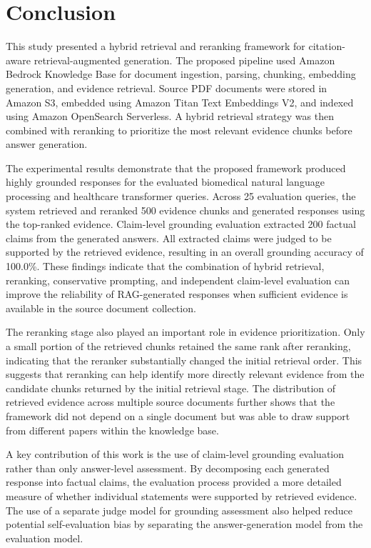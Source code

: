 \section{Conclusion}

This study presented a hybrid retrieval and reranking framework for citation-aware retrieval-augmented generation. The proposed pipeline used Amazon Bedrock Knowledge Base for document ingestion, parsing, chunking, embedding generation, and evidence retrieval. Source PDF documents were stored in Amazon S3, embedded using Amazon Titan Text Embeddings V2, and indexed using Amazon OpenSearch Serverless. A hybrid retrieval strategy was then combined with reranking to prioritize the most relevant evidence chunks before answer generation.

The experimental results demonstrate that the proposed framework produced highly grounded responses for the evaluated biomedical natural language processing and healthcare transformer queries. Across 25 evaluation queries, the system retrieved and reranked 500 evidence chunks and generated responses using the top-ranked evidence. Claim-level grounding evaluation extracted 200 factual claims from the generated answers. All extracted claims were judged to be supported by the retrieved evidence, resulting in an overall grounding accuracy of 100.0\%. These findings indicate that the combination of hybrid retrieval, reranking, conservative prompting, and independent claim-level evaluation can improve the reliability of RAG-generated responses when sufficient evidence is available in the source document collection.

The reranking stage also played an important role in evidence prioritization. Only a small portion of the retrieved chunks retained the same rank after reranking, indicating that the reranker substantially changed the initial retrieval order. This suggests that reranking can help identify more directly relevant evidence from the candidate chunks returned by the initial retrieval stage. The distribution of retrieved evidence across multiple source documents further shows that the framework did not depend on a single document but was able to draw support from different papers within the knowledge base.

A key contribution of this work is the use of claim-level grounding evaluation rather than only answer-level assessment. By decomposing each generated response into factual claims, the evaluation process provided a more detailed measure of whether individual statements were supported by retrieved evidence. The use of a separate judge model for grounding assessment also helped reduce potential self-evaluation bias by separating the answer-generation model from the evaluation model.

